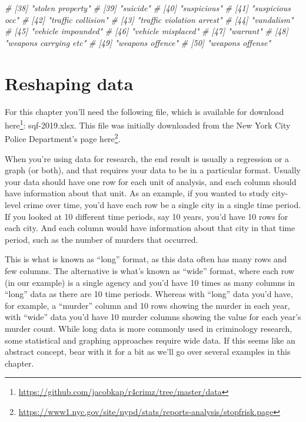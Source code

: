 \documentclass[
  a4paper,
]{krantz}
\makeatletter
\newenvironment{Shaded}{\begin{snugshade}}{\end{snugshade}}
\newcommand{\CommentTok}[1]{\textcolor[rgb]{0.37,0.37,0.37}{\textit{#1}}}
\renewcommand{\href}[2]{#2\footnote{\url{#1}}}
\newenvironment{kframe}{%
\medskip{}
\setlength{\fboxsep}{.8em}
 \def\at@end@of@kframe{}%
 \ifinner\ifhmode%
  \def\at@end@of@kframe{\end{minipage}}%
  \begin{minipage}{\columnwidth}%
 \fi\fi%
 \def\FrameCommand##1{\hskip\@totalleftmargin \hskip-\fboxsep
 \colorbox{shadecolor}{##1}\hskip-\fboxsep
     \hskip-\linewidth \hskip-\@totalleftmargin \hskip\columnwidth}%
 \MakeFramed {\advance\hsize-\width
   \@totalleftmargin\z@ \linewidth\hsize
   \@setminipage}}%
 {\par\unskip\endMakeFramed%
 \at@end@of@kframe}
\renewenvironment{Shaded}{\begin{kframe}}{\end{kframe}}
\makeatother
\begin{document}
\begin{Shaded}
\begin{Highlighting}[]
\CommentTok{\# [38] "stolen property"                           }
\CommentTok{\# [39] "suicide"                                   }
\CommentTok{\# [40] "suspicious"                                }
\CommentTok{\# [41] "suspicious occ"                            }
\CommentTok{\# [42] "traffic collision"                         }
\CommentTok{\# [43] "traffic violation arrest"                  }
\CommentTok{\# [44] "vandalism"                                 }
\CommentTok{\# [45] "vehicle impounded"                         }
\CommentTok{\# [46] "vehicle misplaced"                         }
\CommentTok{\# [47] "warrant"                                   }
\CommentTok{\# [48] "weapons carrying etc"                      }
\CommentTok{\# [49] "weapons offence"                           }
\CommentTok{\# [50] "weapons offense"}
\end{Highlighting}
\end{Shaded}

\hypertarget{reshaping}{%
\chapter{Reshaping data}\label{reshaping}}

For this chapter you'll need the following file, which is
available for download
\href{https://github.com/jacobkap/r4crimz/tree/master/data}{here}:
sqf-2019.xlsx. This file was initially downloaded from the
New York City Police Department's page
\href{https://www1.nyc.gov/site/nypd/stats/reports-analysis/stopfrisk.page}{here}.

When you're using data for research, the end result is
usually a regression or a graph (or both), and that requires
your data to be in a particular format. Usually your data
should have one row for each unit of analysis, and each
column should have information about that unit. As an
example, if you wanted to study city-level crime over time,
you'd have each row be a single city in a single time
period. If you looked at 10 different time periods, say 10
years, you'd have 10 rows for each city. And each column
would have information about that city in that time period,
such as the number of murders that occurred.

This is what is known as ``long'' format, as this data often
has many rows and few columns. The alternative is what's
known as ``wide'' format, where each row (in our example) is
a single agency and you'd have 10 times as many columns in
``long'' data as there are 10 time periods. Whereas with
``long'' data you'd have, for example, a ``murder'' column
and 10 rows showing the murder in each year, with ``wide''
data you'd have 10 murder columns showing the value for each
year's murder count. While long data is more commonly used
in criminology research, some statistical and graphing
approaches require wide data. If this seems like an abstract
concept, bear with it for a bit as we'll go over several
examples in this chapter.
\end{document}
